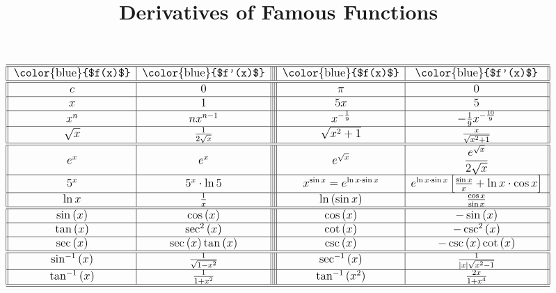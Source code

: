 \documentclass{ximera}
\title{Derivatives of Famous Functions}
\begin{document}
\begin{abstract}
\end{abstract}
\maketitle
\[
{\large{\begin{tabular}{|| c | c |||| c | c ||}\hline\hline
\color{blue}{$f(x)$}& \color{blue}{$f'(x)$} & \color{blue}{$f(x)$} & \color{blue}{$f'(x)$}  \\ 
\hline\hline

 $c$ & 0 & $\pi$ & $0$
 
 \\

\hline

$x$ & $1$ & $5x$ & $5$
\\
\hline

$x^n$ & $nx^{n-1}$ & $x^{-\frac{1}{9}}$ & $-\frac{1}{9}x^{-\frac{10}{9}}$\\

\hline
$\sqrt{x}$ & $\frac{1}{2\sqrt{x}}$ & $\sqrt{x^2+1}$ & $\frac{x}{\sqrt{x^2+1}}$\\

\hline
\hline
$e^x$ & $e^x$  & $e^{\sqrt{x}}$ & $\dfrac{e^{\sqrt{x}}}{2\sqrt{x}}$\\


\hline
$5^x$ & $5^x\cdot\ln{5}$  & $x^{\sin{x}}=e^{\ln{x}\cdot\sin{x}}$ & $e^{\ln{x}\cdot\sin{x}}\left[\frac{\sin{x}}{x}+\ln{x}\cdot\cos{x}\right]$\\

\hline
$\ln{x}$ & $\frac{1}{x}$ & $\ln{\left(\sin{x}\right)}$ & $\frac{\cos{x}}{\sin{x}}$ \\
\hline
\hline
$\sin{(x)}$ & $\cos{(x)}$ & $\cos{(x)}$ & $-\sin{(x)}$\\

\hline
$\tan{(x)}$ & $\sec^2{(x)}$ & $\cot{(x)}$ & $-\csc^2{(x)}$\\

\hline
$\sec{(x)}$ & $\sec{(x)}\tan{(x)}$ & $\csc{(x)}$ & $-\csc{(x)}\cot{(x)}$\\
\hline
\hline
$\sin^{-1}{(x)}$ & $\frac{1}{\sqrt{1-x^2}}$ & $\sec^{-1}{(x)}$ & $\frac{1}{|x|\sqrt{x^2-1}}$\\

\hline
$\tan^{-1}{(x)}$ & $\frac{1}{1+x^2}$ & $\tan^{-1}{(x^2)}$ & $\frac{2x}{1+x^4}$\\

\hline
\hline

\end{tabular}}}
\]
\pagebreak
\end{document}
